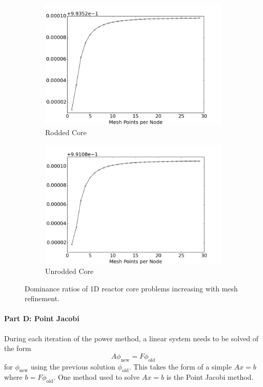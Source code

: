 \documentclass[12pt]{report}
\begin{document}
			\begin{figure}[ht]
				\centering
				\begin{subfigure}{.5\textwidth}
					\centering
					\includegraphics[width=.9\linewidth]{DR.png}
					\caption{Rodded Core}
					\label{fig::rod_dr}
				\end{subfigure}%
				\begin{subfigure}{.5\textwidth}
					\centering
					\includegraphics[width=.9\linewidth]{urod_DR.png}
					\caption{Unrodded Core}
					\label{fig::urod_dr}
				\end{subfigure}
				\caption{Dominance ratios of 1D reactor core problems increasing with mesh refinement.}
				\label{fig::dr}
			\end{figure}
				
	\paragraph{Part D: Point Jacobi}
	During each iteration of the power method, a linear system needs to be solved of the form
	\begin{equation}
	A \phi_\text{new} = F \phi_\text{old}
	\end{equation}
	for $\phi_\text{new}$ using the previous solution $\phi_\text{old}$. This takes the form of a simple $Ax = b$ where $b = F\phi_\text{old}$. One method used to solve $Ax = b$ is the Point Jacobi method. 
	
\end{document}
